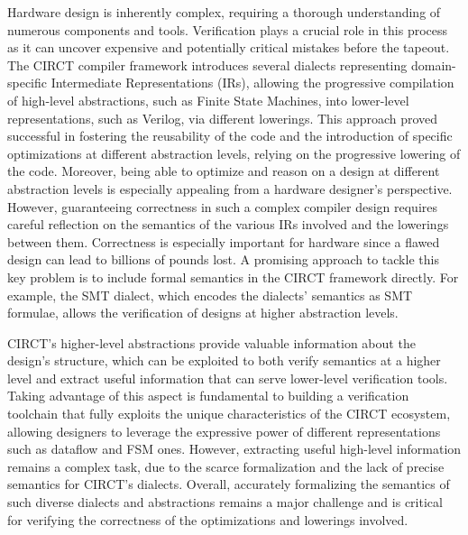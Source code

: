 \documentclass[]{article}
\begin{document}
Hardware design is inherently complex, requiring a thorough understanding of numerous components and tools. 
Verification plays a crucial role in this process as it can uncover expensive and potentially critical mistakes before the tapeout. 
The CIRCT compiler framework introduces several dialects representing domain-specific Intermediate Representations (IRs), 
allowing the progressive compilation of high-level abstractions, such as Finite State Machines, into lower-level representations,
such as Verilog, via different lowerings. This approach proved successful in fostering the reusability of the code and the introduction 
of specific optimizations at different abstraction levels, relying on the progressive lowering of the code. 
Moreover, being able to optimize and reason on a design at different abstraction levels is especially appealing from a 
hardware designer’s perspective. However, guaranteeing correctness in such a complex compiler design requires careful reflection 
on the semantics of the various IRs involved and the lowerings between them. 
Correctness is especially important for hardware since a flawed design can lead to billions of pounds lost. 
A promising approach to tackle this key problem is to include formal semantics in the CIRCT framework directly. 
For example, the SMT dialect, which encodes the dialects' semantics as SMT formulae, allows the verification of designs at higher abstraction levels. 

CIRCT's higher-level abstractions provide valuable information about the design's structure, 
which can be exploited to both verify semantics at a higher level and extract useful information that can serve lower-level verification tools. 
Taking advantage of this aspect is fundamental to building a verification toolchain that fully exploits the unique characteristics of the CIRCT ecosystem, 
allowing designers to leverage the expressive power of different representations such as dataflow and FSM ones. 
However, extracting useful high-level information remains a complex task, due to the scarce formalization and the lack of precise semantics for CIRCT's dialects. 
Overall, accurately formalizing the semantics of such diverse dialects and abstractions remains a major challenge and is critical for verifying the correctness 
of the optimizations and lowerings involved.
\end{document}

